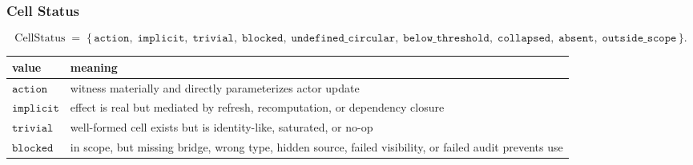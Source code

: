 \documentclass[11pt]{article}
\theoremstyle{definition}
\begin{document}
\subsubsection{Cell Status}

\[
\mathrm{CellStatus}\;=\;\{\,\texttt{action},\;\texttt{implicit},\;\texttt{trivial},\;\texttt{blocked},\;\texttt{undefined\_circular},\;\texttt{below\_threshold},\;\texttt{collapsed},\;\texttt{absent},\;\texttt{outside\_scope}\,\}.
\]

\begin{longtable}[]{@{}ll@{}}
\toprule
\begin{minipage}[b]{0.22\columnwidth}\raggedright
value\strut
\end{minipage} & \begin{minipage}[b]{0.72\columnwidth}\raggedright
meaning\strut
\end{minipage}\tabularnewline
\midrule
\endhead
\begin{minipage}[t]{0.22\columnwidth}\raggedright
\(\texttt{action}\)\strut
\end{minipage} & \begin{minipage}[t]{0.72\columnwidth}\raggedright
witness materially and directly parameterizes actor update\strut
\end{minipage}\tabularnewline
\begin{minipage}[t]{0.22\columnwidth}\raggedright
\(\texttt{implicit}\)\strut
\end{minipage} & \begin{minipage}[t]{0.72\columnwidth}\raggedright
effect is real but mediated by refresh, recomputation, or dependency closure\strut
\end{minipage}\tabularnewline
\begin{minipage}[t]{0.22\columnwidth}\raggedright
\(\texttt{trivial}\)\strut
\end{minipage} & \begin{minipage}[t]{0.72\columnwidth}\raggedright
well-formed cell exists but is identity-like, saturated, or no-op\strut
\end{minipage}\tabularnewline
\begin{minipage}[t]{0.22\columnwidth}\raggedright
\(\texttt{blocked}\)\strut
\end{minipage} & \begin{minipage}[t]{0.72\columnwidth}\raggedright
in scope, but missing bridge, wrong type, hidden source, failed visibility, or failed audit prevents use\strut
\end{minipage}\tabularnewline

\end{longtable}
\end{document}
